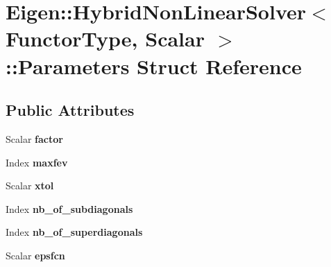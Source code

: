 \hypertarget{struct_eigen_1_1_hybrid_non_linear_solver_1_1_parameters}{}\section{Eigen\+:\+:Hybrid\+Non\+Linear\+Solver$<$ Functor\+Type, Scalar $>$\+:\+:Parameters Struct Reference}
\label{struct_eigen_1_1_hybrid_non_linear_solver_1_1_parameters}
\subsection*{Public Attributes}
\begin{DoxyCompactItemize}
\item 
\mbox{\label{struct_eigen_1_1_hybrid_non_linear_solver_1_1_parameters_a69b495ac20715f7ebaf2022a0cd3d6b5}} 
Scalar {\bfseries factor}
\item 
\mbox{\label{struct_eigen_1_1_hybrid_non_linear_solver_1_1_parameters_ad20b6a0b854b93f339d77bc08fc2990b}} 
Index {\bfseries maxfev}
\item 
\mbox{\label{struct_eigen_1_1_hybrid_non_linear_solver_1_1_parameters_a9e94c8adcbe77b10f60d75e9e2520460}} 
Scalar {\bfseries xtol}
\item 
\mbox{\label{struct_eigen_1_1_hybrid_non_linear_solver_1_1_parameters_a125218e654873bda27e0106ab309df56}} 
Index {\bfseries nb\+\_\+of\+\_\+subdiagonals}
\item 
\mbox{\label{struct_eigen_1_1_hybrid_non_linear_solver_1_1_parameters_a1dcb3e0d548b1be7c6a14decbde75d35}} 
Index {\bfseries nb\+\_\+of\+\_\+superdiagonals}
\item 
\mbox{\label{struct_eigen_1_1_hybrid_non_linear_solver_1_1_parameters_a978be043045e930edc9bfb6b86696d7e}} 
Scalar {\bfseries epsfcn}
\end{DoxyCompactItemize}


